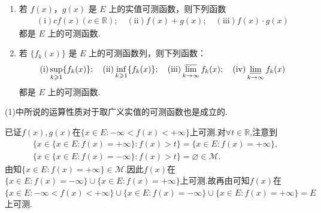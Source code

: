 \documentclass[../../main.tex]{subfiles}%
\begin{document}
\begin{theorem}[可测函数的运算性质]\label{theorem:可测函数的运算性质}
\begin{enumerate}[(1)]
\item 若 \(f(x)\)，\(g(x)\) 是 \(E\) 上的实值可测函数，则下列函数
\begin{align*}
(\text{i})cf(x)(c \in \mathbb{R});\quad (\text{ii}) f(x) + g(x); \quad (\text{iii})f(x)\cdot g(x)
\end{align*}
都是 \(E\) 上的可测函数.

\item 若 \(\{f_k(x)\}\) 是 \(E\) 上的可测函数列，则下列函数：
\begin{align*}
(\text{i}) \sup_{k \geqslant 1}\{f_k(x)\};\quad (\text{ii})\inf_{k \geqslant 1}\{f_k(x)\} ;\quad (\text{iii})\varlimsup_{k \to \infty} f_k(x) ;\quad (\text{iv}) \varliminf_{k \to \infty} f_k(x)
\end{align*}
都是 \(E\) 上的可测函数.
\end{enumerate}
\end{theorem}
\begin{remark}
(1)中所说的运算性质对于取广义实值的可测函数也是成立的.

已证$f(x),g(x)$在$\{x\in E:-\infty<f(x)<+\infty\}$上可测.对$\forall t\in \mathbb{R}$,注意到
\begin{gather*}
\{x\in  \{x\in E:f(x)=+\infty\}:f(x)>t\}=\{x\in E:f(x)=+\infty\},
\\
\{x\in \{x\in E:f(x)=-\infty\}:f(x)>t\}=\varnothing\in \mathscr{M}.
\end{gather*}
由知$\{x\in E:f(x)=+\infty\}\in \mathscr{M}$.因此$f(x)$在$\{x\in E:f(x)=-\infty\}\cup\{x\in E:f(x)=+\infty\}$上可测.故再由可知$f(x)$在$\{x\in E:-\infty<f(x)<+\infty\}\cup \{x\in E:f(x)=-\infty\}\cup\{x\in E:f(x)=+\infty\}=E$上可测.

\end{remark}
\end{document}
